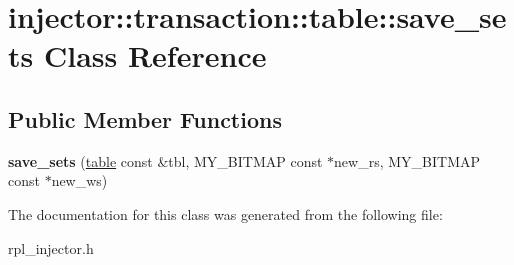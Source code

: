\hypertarget{classinjector_1_1transaction_1_1table_1_1save__sets}{}\section{injector\+:\+:transaction\+:\+:table\+:\+:save\+\_\+sets Class Reference}
\label{classinjector_1_1transaction_1_1table_1_1save__sets}
\subsection*{Public Member Functions}
\begin{DoxyCompactItemize}
\item 
\mbox{\label{classinjector_1_1transaction_1_1table_1_1save__sets_a9b36230720fc7186d14e580c7277e245}} 
{\bfseries save\+\_\+sets} (\mbox{\hyperlink{classinjector_1_1transaction_1_1table}{table}} const \&tbl, M\+Y\+\_\+\+B\+I\+T\+M\+AP const $\ast$new\+\_\+rs, M\+Y\+\_\+\+B\+I\+T\+M\+AP const $\ast$new\+\_\+ws)
\end{DoxyCompactItemize}


The documentation for this class was generated from the following file\+:\begin{DoxyCompactItemize}
\item 
rpl\+\_\+injector.\+h\end{DoxyCompactItemize}

